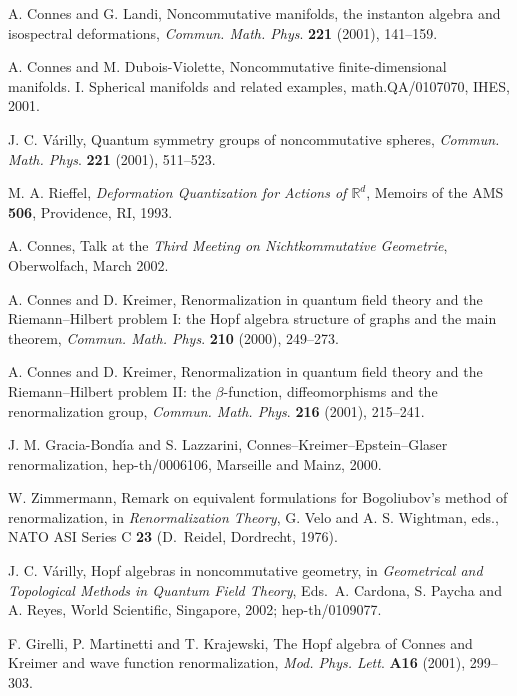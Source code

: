 \documentclass[a4paper,12pt]{article}
\newcommand{\R}{\mathbb{R}}         %
\newcommand{\1}{\mathbf{1}}         %
\newcommand{\7}{\dagger}            %
\newcommand{\8}{\bullet}            %
\renewcommand{\.}{\cdot}            %
\renewcommand{\:}{\colon}           %
\begin{document}
\begin{thebibliography}{74}
A. Connes and G. Landi,
Noncommutative manifolds, the instanton algebra and isospectral
deformations,
\textit{Commun. Math. Phys}. {\bf 221} (2001), 141--159.

A. Connes and M. Dubois-Violette,
Noncommutative finite-dimensional manifolds. I. Spherical manifolds
and related examples,
math.QA/0107070, IHES, 2001.

J. C. V\'arilly,
Quantum symmetry groups of noncommutative spheres,
\textit{Commun. Math. Phys}. {\bf 221} (2001), 511--523.

M. A. Rieffel,
\textit{Deformation Quantization for Actions of $\R^d$},
Memoirs of the AMS {\bf 506}, Providence, RI, 1993.

A. Connes,
Talk at the \textit{Third Meeting on Nichtkommutative Geometrie},
Oberwolfach, March 2002.

A. Connes and D. Kreimer,
Renormalization in quantum field theory and the Riemann--Hilbert
problem I: the Hopf algebra structure of graphs and the main
theorem,
\textit{Commun. Math. Phys}. {\bf 210} (2000), 249--273.

A. Connes and D. Kreimer,
Renormalization in quantum field theory and the Riemann--Hilbert
problem II: the $\beta$-function, diffeomorphisms and the
renormalization group,
\textit{Commun. Math. Phys}. {\bf 216} (2001), 215--241.

J. M. Gracia-Bond\'{\i}a and S. Lazzarini,
Connes--Kreimer--Epstein--Glaser renormalization,
hep-th/0006106, Marseille and Mainz, 2000.

W. Zimmermann,
Remark on equivalent formulations for Bogoliubov's method of
renormalization,
in \textit{Renormalization Theory},
G. Velo and A. S. Wightman, eds.,
NATO ASI Series C {\bf 23} (D.~Reidel, Dordrecht, 1976).

J. C. V\'arilly,
Hopf algebras in noncommutative geometry,
in
\textit{Geometrical and Topological Methods in Quantum Field Theory},
Eds.\ A. Cardona, S. Paycha and A. Reyes, 
World Scientific, Singapore, 2002;
hep-th/0109077.

F. Girelli, P. Martinetti and T. Krajewski,
The Hopf algebra of Connes and Kreimer and wave function
renormalization,
\textit{Mod. Phys. Lett}. {\bf A16} (2001), 299--303.


\end{thebibliography}
\end{document}
